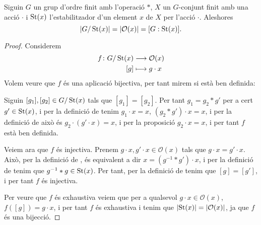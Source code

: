\documentclass[../Apunts.tex]{subfiles}
\begin{document}
	\begin{proposition}
		\label{prop:cardinal del grup dividit per cardinal de l'estabilitzador és el cardinal de l'òrbita}
		Siguin \(G\) un grup d'ordre finit amb l'operació \(\ast\), \(X\) un \(G\)-conjunt finit amb una acció \(\cdot\) i \(\operatorname{St}(x)\) l'estabilitzador d'un element \(x\) de \(X\) per l'acció \(\cdot\). Aleshores
		\[\abs{G/\St(x)}=\abs{\mathcal{O}(x)}=[G:\St(x)].\]
		\begin{proof}
			Considerem
			\begin{align*}
			f\colon G/\operatorname{St}(x)&\longrightarrow\mathcal{O}(x)\\
			[g]&\longmapsto g\cdot x
			\end{align*}
			Volem veure que \(f\) és una aplicació bijectiva, per tant mirem si està ben definida:
			
			Siguin \([g_{1}],[g_{2}]\in G/\operatorname{St}(x)\) tals que \([g_{1}]=[g_{2}]\). Per tant \(g_{1}=g_{2}\ast g'\) per a cert \(g'\in\operatorname{St}(x)\), i per la definició de  tenim \(g_{1}\cdot x=x\), \((g_{2}\ast g')\cdot x=x\), i per la definició de  això és \(g_{2}\cdot(g'\cdot x)=x\), i per la proposició  \(g_{2}\cdot x=x\), i per tant \(f\) està ben definida.
			
			Veiem ara que \(f\) és injectiva. Prenem \(g\cdot x,g'\cdot x\in\mathcal{O}(x)\) tals que \(g\cdot x=g'\cdot x\). Això, per la definició de , és equivalent a dir \(x=(g^{-1}\ast g')\cdot x\), i per la definició de  tenim que \(g^{-1}\ast g\in\operatorname{St}(x)\). Per tant, per la definició de  tenim que \([g]=[g']\), i per tant \(f\) és injectiva.
			
			Per veure que \(f\) és exhaustiva veiem que per a qualsevol \(g\cdot x\in\mathcal{O}(x)\), \(f([g])=g\cdot x\), i per tant \(f\) és exhaustiva i tenim que \(\abs{\St(x)}=\abs{\mathcal{O}(x)}\), ja que \(f\) és una bijecció. %
		\end{proof}
	\end{proposition}
\end{document}
